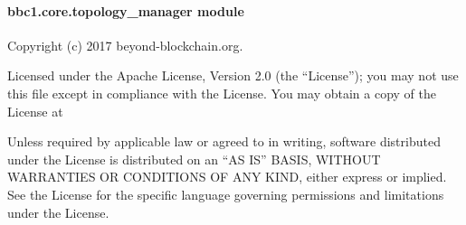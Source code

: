 \documentclass[letterpaper,10pt,english]{sphinxmanual}
\begin{document}
\paragraph{bbc1.core.topology\_manager module}
\label{\detokenize{bbc1.core.topology_manager:module-bbc1.core.topology_manager}}\label{\detokenize{bbc1.core.topology_manager::doc}}\label{\detokenize{bbc1.core.topology_manager:bbc1-core-topology-manager-module}}
Copyright (c) 2017 beyond-blockchain.org.

Licensed under the Apache License, Version 2.0 (the “License”);
you may not use this file except in compliance with the License.
You may obtain a copy of the License at
\begin{quote}

\end{quote}

Unless required by applicable law or agreed to in writing, software
distributed under the License is distributed on an “AS IS” BASIS,
WITHOUT WARRANTIES OR CONDITIONS OF ANY KIND, either express or implied.
See the License for the specific language governing permissions and
limitations under the License.
\end{document}
